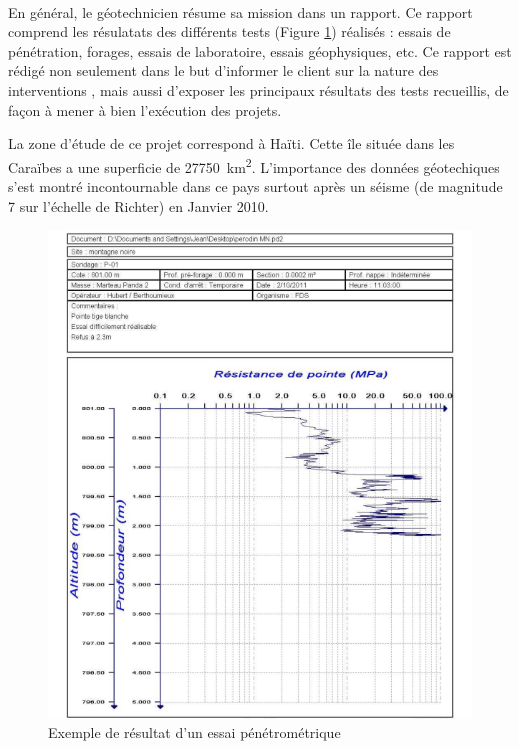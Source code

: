 \paragraph{}
En général, le géotechnicien résume sa mission dans un rapport.
Ce rapport comprend les résulatats des différents tests (Figure \ref{fig:test_penetrometrique}) réalisés : essais de pénétration, forages, essais de laboratoire,
essais géophysiques, etc.
Ce rapport est rédigé non seulement dans le but d’informer le client sur la nature des interventions
, mais aussi d’exposer les principaux résultats des tests recueillis, de façon à mener à bien
l’exécution des projets.
\par
La zone d'étude de ce projet correspond à Haïti. 
Cette île située dans les Caraïbes a une superficie de  \SI{27750}{\kilo\metre\squared}.
L'importance des données géotechiques s'est montré incontournable dans ce pays surtout 
après un séisme (de magnitude 7 sur l'échelle de Richter) en Janvier 2010.
\begin{figure}
    \centering
    \includegraphics[width=1\textwidth]{images/Contexte/penetrographe.png}
    \caption{Exemple de résultat d'un essai pénétrométrique}
    \label{fig:test_penetrometrique}
\end{figure}
